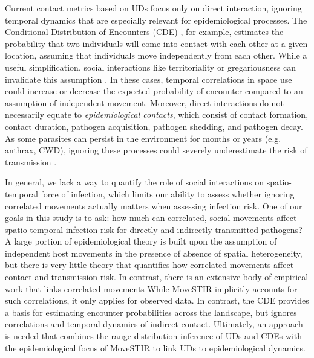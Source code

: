 \documentclass[letterpaper]{article}
\begin{document}
Current contact metrics based on UDs focus only on direct interaction, ignoring temporal dynamics that are especially relevant for epidemiological processes. The Conditional Distribution of Encounters (CDE) \citep{Noonan2021}, for example, estimates the probability that two individuals will come into contact with each other at a given location, assuming that individuals move independently from each other.
While a useful simplification, social interactions like territoriality or gregariousness can invalidate this assumption  \citep{Manlove2018,Sah2018}. In these cases, temporal correlations in space use could increase or decrease the expected probability of encounter compared to an assumption of independent movement. 
Moreover, direct interactions do not necessarily equate to \emph{epidemiological contacts}, which consist of contact formation, contact duration, pathogen acquisition, pathogen shedding, and pathogen decay. As some parasites can persist in the environment for months or years (e.g. anthrax, CWD), ignoring these processes could severely underestimate the risk of transmission \citep{Wilber2022,Yang2023,Richardson2015}.

In general, we lack a way to quantify the role of social interactions on spatio-temporal force of infection, which limits our ability to assess whether ignoring correlated movements actually matters when assessing infection risk. One of our goals in this study is to ask: how much can correlated, social movements affect spatio-temporal infection risk for directly and indirectly transmitted pathogens? A large portion of epidemiological theory is built upon the assumption of independent host movements in the presence of absence of spatial heterogeneity, but there is very little theory that quantifies how correlated movements affect contact and transmission risk.  In contrast, there is an extensive body of empirical work that links correlated movements While MoveSTIR implicitly accounts for such correlations, it only applies for observed data. In contrast, the CDE provides a basis for estimating encounter probabilities across the landscape, but ignores correlations and temporal dynamics of indirect contact.
Ultimately, an approach is needed that combines the range-distribution inference of UDs and CDEs \citep{Alston2022,Noonan2021} with the epidemiological focus of MoveSTIR to link UDs to epidemiological dynamics. 
\end{document}
